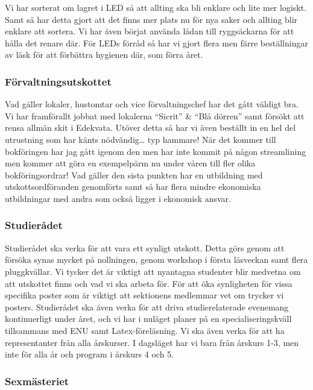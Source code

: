 \documentclass[../_main/handlingar.tex]{subfiles}
\begin{document}
Vi har sorterat om lagret i LED så att allting ska bli enklare och lite mer logiskt. Samt så har detta gjort att det finns mer plats nu för nya saker och allting blir enklare att sortera. Vi har även börjat använda lådan till ryggsäckarna för att hålla det renare där. För LEDs förråd så har vi gjort flera men färre beställningar av läsk för att förbättra hygienen där, som förra året.

\subsubsection*{Förvaltningsutskottet}

Vad gäller lokaler, hustomtar och vice förvaltningschef har det gått väldigt bra. Vi har framförallt jobbat med lokalerna “Sicrit” & “Blå dörren” samt försökt att rensa allmän skit i Edekvata. Utöver detta så har vi även beställt in en hel del utrustning som har känts nödvändig… typ hammare!
När det kommer till bokföringen har jag gått igenom den men har inte kommit på någon streamlining men kommer att göra en exempelpärm nu under våren till fler olika bokföringsordrar!
Vad gäller den sista punkten har en utbildning med utskottsordföranden genomförts samt så har flera mindre ekonomiska utbildningar med andra som också ligger i ekonomisk ansvar.

\subsubsection*{Studierådet}

Studierådet ska verka för att vara ett synligt utskott. Detta görs genom att försöka synas mycket på nollningen, genom workshop i första läsveckan samt flera pluggkvällar. Vi tycker det är viktigt att nyantagna studenter blir medvetna om att utskottet finns och vad vi ska arbeta för. För att öka synligheten för vissa specifika poster som är viktigt att sektionens medlemmar vet om trycker vi posters. Studierådet ska även verka för att driva studierelaterade evenemang kontinuerligt under året, och vi har i nuläget planer på en specialiseringskväll tillsammans med ENU samt Latex-föreläsning. Vi ska även verka för att ha representanter från alla årskurser. I dagsläget har vi bara från årskurs 1-3, men inte för alla år och program i årskurs 4 och 5. 


\subsubsection*{Sexmästeriet}
\end{document}
